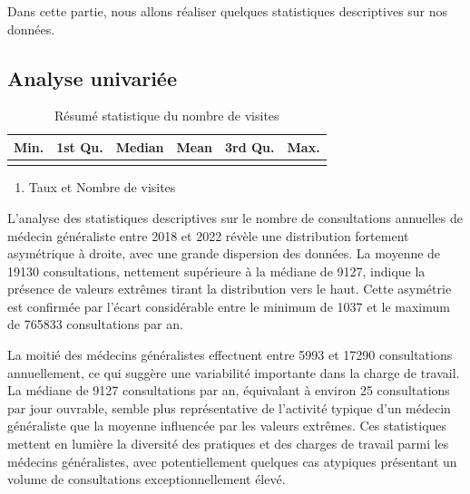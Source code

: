\documentclass[
]{article}
\providecommand{\tightlist}{%
  \setlength{\itemsep}{0pt}\setlength{\parskip}{0pt}}
\begin{document}
Dans cette partie, nous allons réaliser quelques statistiques
descriptives sur nos données.

\hypertarget{analyse-univariuxe9e}{%
\subsection{Analyse univariée}\label{analyse-univariuxe9e}}

\begin{table}[H]

\caption{\label{tab:unnamed-chunk-9}Résumé statistique du nombre de visites}
\centering
\begin{tabular}[t]{rrrrrr}
\toprule
Min. & 1st Qu. & Median & Mean & 3rd Qu. & Max.\\
\midrule
\cellcolor{gray!6}{1037} & \cellcolor{gray!6}{5993} & \cellcolor{gray!6}{9127} & \cellcolor{gray!6}{19129.63} & \cellcolor{gray!6}{17290} & \cellcolor{gray!6}{765833}\\
\bottomrule
\end{tabular}
\end{table}

\begin{enumerate}
\def\labelenumi{\arabic{enumi}.}
\tightlist
\item
  Taux et Nombre de visites
\end{enumerate}

L'analyse des statistiques descriptives sur le nombre de consultations
annuelles de médecin généraliste entre 2018 et 2022 révèle une
distribution fortement asymétrique à droite, avec une grande dispersion
des données. La moyenne de 19130 consultations, nettement supérieure à
la médiane de 9127, indique la présence de valeurs extrêmes tirant la
distribution vers le haut. Cette asymétrie est confirmée par l'écart
considérable entre le minimum de 1037 et le maximum de 765833
consultations par an.

La moitié des médecins généralistes effectuent entre 5993 et 17290
consultations annuellement, ce qui suggère une variabilité importante
dans la charge de travail. La médiane de 9127 consultations par an,
équivalant à environ 25 consultations par jour ouvrable, semble plus
représentative de l'activité typique d'un médecin généraliste que la
moyenne influencée par les valeurs extrêmes. Ces statistiques mettent en
lumière la diversité des pratiques et des charges de travail parmi les
médecins généralistes, avec potentiellement quelques cas atypiques
présentant un volume de consultations exceptionnellement élevé.
\end{document}
